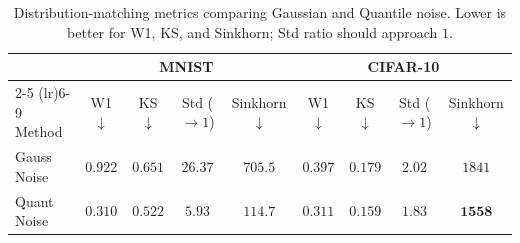 \documentclass{article}
\theoremstyle{plain}
\theoremstyle{definition}
\theoremstyle{remark}
\begin{document}
\begin{table}[h]
\centering
\small
\setlength{\tabcolsep}{6pt}
\begin{tabular}{lcccccccc}
\toprule
& \multicolumn{4}{c}{MNIST} & \multicolumn{4}{c}{CIFAR-10} \\
\cmidrule(lr){2-5} \cmidrule(lr){6-9}
Method & W1 $\downarrow$ & KS $\downarrow$ & Std ($\to 1$) & Sinkhorn $\downarrow$ & W1 $\downarrow$ & KS $\downarrow$ & Std ($\to 1$) & Sinkhorn $\downarrow$ \\
\midrule
Gauss Noise& $0.922$ & $0.651$ & $26.37$ & $705.5$ & $0.397$ & $0.179$ & $2.02$ & $1841$ \\
Quant Noise& $\mathbf{0.310}$ & $\mathbf{0.522}$ & $\mathbf{5.93}$ & $\mathbf{114.7}$ & $\mathbf{0.311}$ & $\mathbf{0.159}$ & $\mathbf{1.83}$ & $\mathbf{1558}$ \\
\bottomrule
\end{tabular}
\caption{Distribution-matching metrics comparing Gaussian and Quantile noise. Lower is better for W1, KS, and Sinkhorn; Std ratio should approach $1$.}
\label{tab:noise_match}
\end{table}
\end{document}
